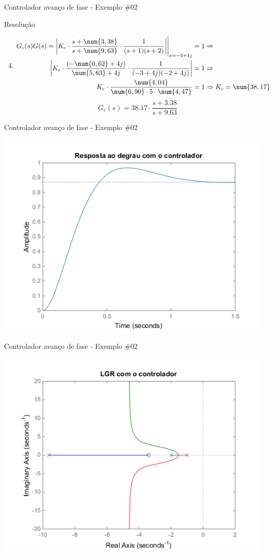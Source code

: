 \begin{frame}{Controlador avanço de fase - Exemplo \#02}
\begin{block}{Resolução}
\begin{enumerate}
	\setcounter{enumi}{3}
	\item \begin{align*}
	G_c(s)G(s)=\eval{\left| K_c\cdot\dfrac{s+\num{3,38}}{s+\num{9,63}}\cdot\dfrac{1}{(s+1)(s+2)}\right|}_{s=-4+4j}&=1\Rightarrow\\
	\left| K_c\cdot\dfrac{(-\num{0,62}+4j)}{\num{5,63}+4j}\cdot\dfrac{1}{(-3+4j)(-2+4j)} \right|&=1\Rightarrow\\
	K_c\cdot\dfrac{\num{4,04}}{\num{6,90}\cdot5\cdot\num{4,47}}&=1\Rightarrow K_c=\num{38,17}
	\end{align*}
	\[ \boxed{G_c(s)=\num{38,17}\cdot\dfrac{s+\num{3,38}}{s+\num{9,63}}} \]
\end{enumerate}
\end{block}
\end{frame}

\begin{frame}{Controlador avanço de fase - Exemplo \#02}
\centerline{\includegraphics[width=0.8\linewidth]{Figuras/Ch09/fig8.png}}
\end{frame}

\begin{frame}{Controlador avanço de fase - Exemplo \#02}
\centerline{\includegraphics[width=0.8\linewidth]{Figuras/Ch09/fig9.png}}
\end{frame}

